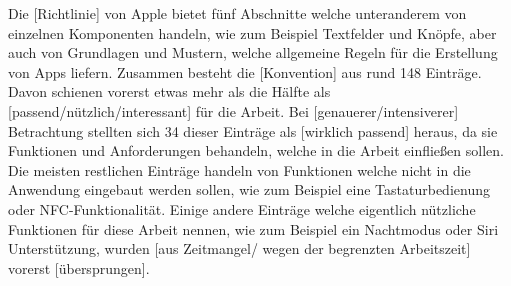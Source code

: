 {	\myNewSection
		Die [Richtlinie] von Apple bietet fünf Abschnitte welche unteranderem von einzelnen Komponenten handeln, wie zum Beispiel Textfelder und Knöpfe, aber auch von Grundlagen und Mustern, welche allgemeine Regeln für die Erstellung von Apps liefern. Zusammen besteht die [Konvention] aus rund 148 Einträge. %
		Davon schienen vorerst etwas mehr als die Hälfte als [passend/nützlich/interessant] für die Arbeit. Bei [genauerer/intensiverer] Betrachtung stellten sich 34 dieser Einträge als [wirklich passend] heraus, da sie Funktionen und Anforderungen behandeln, welche in die Arbeit einfließen sollen. %
		Die meisten restlichen Einträge handeln von Funktionen welche nicht in die Anwendung eingebaut werden sollen, wie zum Beispiel eine Tastaturbedienung oder NFC-Funktionalität\cite{konventionen_keyboard, konventionen_nfc}. Einige andere Einträge welche eigentlich nützliche Funktionen für diese Arbeit nennen, wie zum Beispiel ein Nachtmodus oder Siri Unterstützung, wurden [aus Zeitmangel/ wegen der begrenzten Arbeitszeit] vorerst [übersprungen]\cite{konventionen_darkmode,konventionen_siri}.%
		
}
